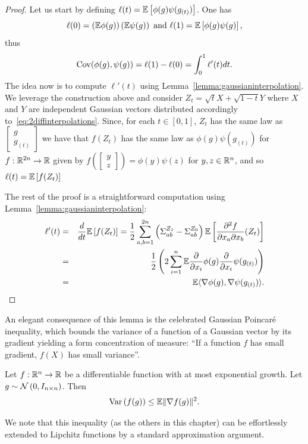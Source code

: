 \begin{proof}
Let us start by defining $\ell(t) = \mathbb{E} \left[\phi(g)\psi(g_{(t)})\right]$. One has
\[
\ell(0) = \left(\mathbb{E} \phi(g)\right)\left(\mathbb{E} \psi(g)\right) \text{ and } \ell(1) = \mathbb{E} \left[\phi(g)\psi(g)\right],
\]
thus
\[
\cov(\phi(g),\psi(g)) = \ell(1)-\ell(0) = \int_0^1 %
\ell'(t)dt.
\]
The idea now is to compute $\ell'(t)$ using Lemma~\ref{lemma:gaussianinterpolation}. We leverage the construction above and consider $Z_t=\sqrt{t}X+\sqrt{1-t}Y$ where $X$ and $Y$ are independent Gaussian vectors distributed accordingly to~\eqref{eq:2diffinterpolations}. Since, for each $t\in[0,1]$, $Z_t$ has the same law as $\left[\begin{array}{c} g \\ g_{(t)}\end{array}\right]$ we have that $f(Z_t)$ has the same law as $\phi(g)\psi(g_{(t)})$ for $f:\mathbb{R}^{2n}\to\mathbb{R}$ given by $f\left(\left[\begin{array}{c} y \\ z\end{array}\right]\right) = \phi(y)\psi(z)$ for $y,z\in\mathbb{R}^n$, and so $\ell(t) = \mathbb{E} \left[ f(Z_t) \right]$

The rest of the proof is a straightforward computation using Lemma~\ref{lemma:gaussianinterpolation}:
\begin{eqnarray*}
\ell'(t) & = &  \frac{d}{dt}\mathbb{E} \left[ f(Z_t) \right] =  \frac12 \sum_{a,b=1}^{2n} \left( \Sigma^{Z_1}_{ab} - \Sigma^{Z_0}_{ab} \right) \mathbb{E} \left[ \frac{\partial^2 f}{\partial x_a\partial x_b}(Z_t)\right] \\
& = &\frac12 \left(2\sum_{i=1}^n \mathbb{E} \frac{\partial}{\partial x_i}\phi(g) \frac{\partial}{\partial x_i}\psi(g_{(t)}) \right) \\
& = & \mathbb{E} \langle \nabla\phi(g),\nabla\psi(g_{(t)}) \rangle.
\end{eqnarray*}
\end{proof}

An elegant consequence of this lemma is the celebrated Gaussian Poincar\'{e} inequality, which bounds the variance of a function of a Gaussian vector by its gradient yielding a form concentration of measure: ``If a function $f$ has small gradient, $f(X)$ has small variance''.

\begin{proposition}\label{prop:GaussianPoincare}
Let $f:\mathbb{R}^n\to\mathbb{R}$ be a differentiable function with at most exponential growth. Let $g\sim\mathcal{N}\left(0,I_{n\times n}\right)$. Then
\[
\operatorname{Var}\left( f(g) \right) \leq \mathbb{E} \| \nabla f(g)\|^2.
\]
\end{proposition}
We note that this inequality (as the others in this chapter) can be effortlessly extended to Lipchitz functions by a standard approximation argument.


